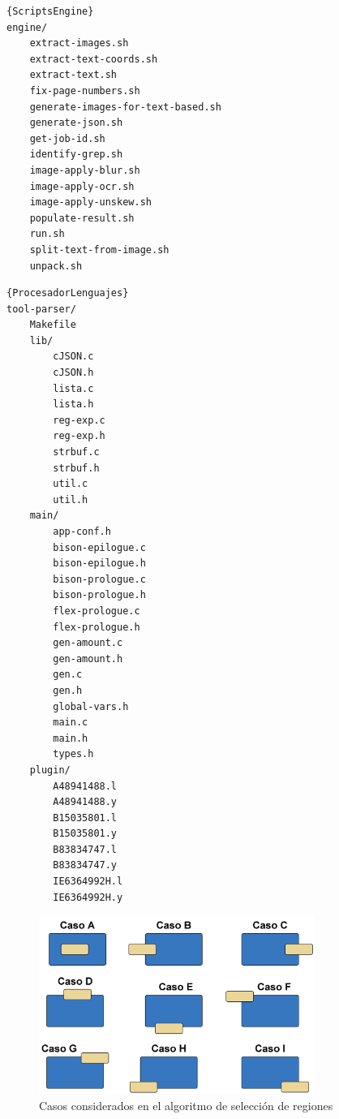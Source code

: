 \noindent\begin{minipage}{.45\textwidth}
\begin{lstlisting}[caption=Scripts del engine]{ScriptsEngine}
engine/
    extract-images.sh
    extract-text-coords.sh
    extract-text.sh
    fix-page-numbers.sh
    generate-images-for-text-based.sh
    generate-json.sh
    get-job-id.sh
    identify-grep.sh
    image-apply-blur.sh
    image-apply-ocr.sh
    image-apply-unskew.sh
    populate-result.sh
    run.sh
    split-text-from-image.sh
    unpack.sh
\end{lstlisting}
\end{minipage}\hfill
\begin{minipage}{.45\textwidth}
\begin{lstlisting}[caption=Fuentes del procesador de lenguaje intermedio,label=lst:fuentes-del-procesador-de-lenguajes]{ProcesadorLenguajes}
tool-parser/
    Makefile
    lib/
        cJSON.c
        cJSON.h
        lista.c
        lista.h
        reg-exp.c
        reg-exp.h
        strbuf.c
        strbuf.h
        util.c
        util.h
    main/
        app-conf.h
        bison-epilogue.c
        bison-epilogue.h
        bison-prologue.c
        bison-prologue.h
        flex-prologue.c
        flex-prologue.h
        gen-amount.c
        gen-amount.h
        gen.c
        gen.h
        global-vars.h
        main.c
        main.h
        types.h
    plugin/
        A48941488.l
        A48941488.y
        B15035801.l
        B15035801.y
        B83834747.l
        B83834747.y
        IE6364992H.l
        IE6364992H.y
\end{lstlisting}
\end{minipage}

\begin{figure}[hp!]
    \centering
    \includegraphics[width=0.8\textwidth]{imaxes/z-adicional/casos-algoritmo-seleccion-regiones.png}
    \caption{Casos considerados en el algoritmo de selección de regiones}
    \label{fig:casos-algoritmo-seleccion-regiones}
\end{figure}

